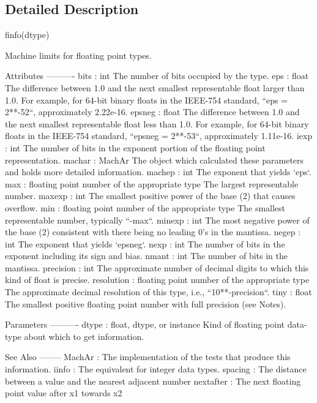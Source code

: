 \subsection{Detailed Description}
\begin{DoxyVerb}finfo(dtype)

Machine limits for floating point types.

Attributes
----------
bits : int
    The number of bits occupied by the type.
eps : float
    The difference between 1.0 and the next smallest representable float
    larger than 1.0. For example, for 64-bit binary floats in the IEEE-754
    standard, ``eps = 2**-52``, approximately 2.22e-16.
epsneg : float
    The difference between 1.0 and the next smallest representable float
    less than 1.0. For example, for 64-bit binary floats in the IEEE-754
    standard, ``epsneg = 2**-53``, approximately 1.11e-16.
iexp : int
    The number of bits in the exponent portion of the floating point
    representation.
machar : MachAr
    The object which calculated these parameters and holds more
    detailed information.
machep : int
    The exponent that yields `eps`.
max : floating point number of the appropriate type
    The largest representable number.
maxexp : int
    The smallest positive power of the base (2) that causes overflow.
min : floating point number of the appropriate type
    The smallest representable number, typically ``-max``.
minexp : int
    The most negative power of the base (2) consistent with there
    being no leading 0's in the mantissa.
negep : int
    The exponent that yields `epsneg`.
nexp : int
    The number of bits in the exponent including its sign and bias.
nmant : int
    The number of bits in the mantissa.
precision : int
    The approximate number of decimal digits to which this kind of
    float is precise.
resolution : floating point number of the appropriate type
    The approximate decimal resolution of this type, i.e.,
    ``10**-precision``.
tiny : float
    The smallest positive floating point number with full precision
    (see Notes).

Parameters
----------
dtype : float, dtype, or instance
    Kind of floating point data-type about which to get information.

See Also
--------
MachAr : The implementation of the tests that produce this information.
iinfo : The equivalent for integer data types.
spacing : The distance between a value and the nearest adjacent number
nextafter : The next floating point value after x1 towards x2


\end{DoxyVerb}
